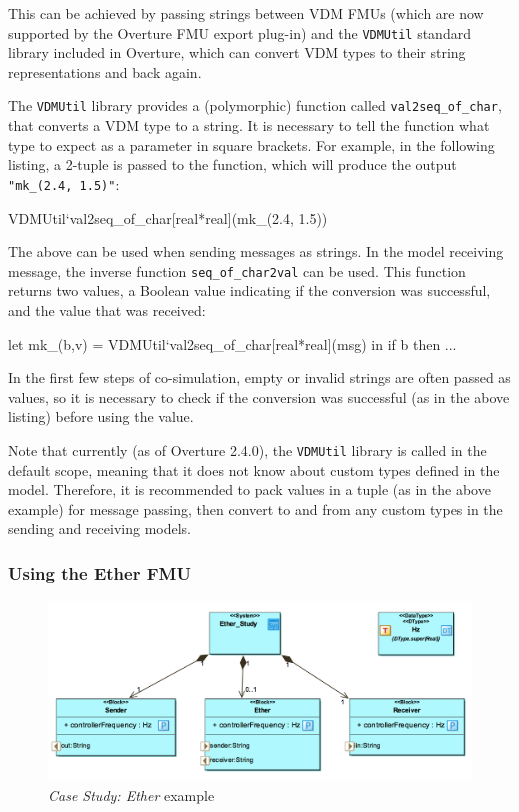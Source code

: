 This can be achieved by passing strings between VDM FMUs (which are now supported by the Overture FMU export plug-in) and the \texttt{VDMUtil} standard library included in Overture, which can convert VDM types to their string representations and back again.

The \texttt{VDMUtil} library provides a (polymorphic) function called \texttt{val2seq\_of\_char}, that converts a VDM type to a string. It is necessary to tell the function what type to expect as a parameter in square brackets. For example, in the following listing, a 2-tuple is passed to the function, which will produce the output \texttt{"mk\_(2.4, 1.5)"}:

\begin{vdm}
VDMUtil`val2seq_of_char[real*real](mk_(2.4, 1.5))
\end{vdm}

The above can be used when sending messages as strings. In the model receiving message, the inverse function \texttt{seq\_of\_char2val} can be used. This function returns two values, a Boolean value indicating if the conversion was successful, and the value that was received:

\begin{vdm}
let mk_(b,v) = VDMUtil`val2seq_of_char[real*real](msg) in
  if b then ...
\end{vdm}

In the first few steps of co-simulation, empty or invalid strings are often passed as values, so it is necessary to check if the conversion was successful (as in the above listing) before using the value.

Note that currently (as of Overture 2.4.0), the \texttt{VDMUtil} library is called in the default scope, meaning that it does not know about custom types defined in the model. Therefore, it is recommended to pack values in a tuple (as in the above example) for message passing, then convert to and from any custom types in the sending and receiving models.

\subsubsection{Using the Ether FMU}

\begin{figure}
\centering
\includegraphics[scale=0.3]{figures/ether_asd}
\caption{\emph{Case Study: Ether} example}
\label{fig:ether_asd}
\end{figure}

